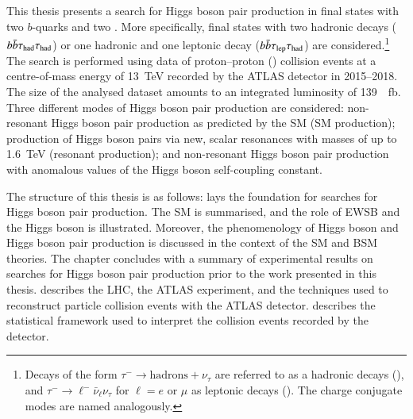 This thesis presents a search for Higgs boson pair production in final states
with two $b$-quarks and two \tauleptons. More specifically, final states with
two hadronic \taulepton decays ($b\bar{b}\tau_{\text{had}}\tau_{\text{had}}$) or one hadronic and one
leptonic \taulepton decay ($b\bar{b}\tau_{\text{lep}}\tau_{\text{had}}$) are considered.\footnote{Decays of
  the form $\tau^- \to \text{hadrons} + \nu_\tau$ are referred to as a hadronic
  \taulepton decays (\tauhad), and $\tau^- \to \ell^- \bar{\nu}_\ell \nu_\tau$
  for $\ell = e$ or $\mu$ as leptonic \taulepton decays (\taulep). The charge
  conjugate modes are named analogously.} The search is performed using data of
proton--proton (\pp) collision events at a centre-of-mass energy of
\SI{13}{\TeV} recorded by the ATLAS detector in 2015--2018. The size of the
analysed dataset amounts to an integrated luminosity of
\SI{139}{\per\femto\barn}. Three different modes of Higgs boson pair production
are considered: non-resonant Higgs boson pair production as predicted by the SM
(SM \HH production); production of Higgs boson pairs via new, scalar resonances
with masses of up to \SI{1.6}{\TeV} (resonant \HH production); and non-resonant
Higgs boson pair production with anomalous values of the Higgs boson
self-coupling constant.

The structure of this thesis is as follows:  lays the
foundation for searches for Higgs boson pair production. The SM is summarised,
and the role of EWSB and the Higgs boson is illustrated. Moreover, the
phenomenology of Higgs boson and Higgs boson pair production is discussed in the
context of the SM and BSM theories. The chapter concludes with a summary of
experimental results on searches for Higgs boson pair production prior to the
work presented in this thesis.   describes the LHC, the
ATLAS experiment, and the techniques used to reconstruct particle collision
events with the ATLAS detector.  describes the
statistical framework used to interpret the collision events recorded by the
detector.

